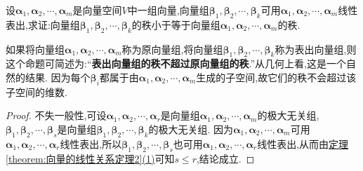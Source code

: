 \documentclass[../../main.tex]{subfiles}
\begin{document}
\begin{proposition}\label{proposition:表出向量组的秩不超过原向量组的秩}
设\(\boldsymbol{\alpha}_1,\boldsymbol{\alpha}_2,\cdots,\boldsymbol{\alpha}_m\)是向量空间\(V\)中一组向量,向量组\(\boldsymbol{\beta}_1,\boldsymbol{\beta}_2,\cdots,\boldsymbol{\beta}_k\)可用\(\boldsymbol{\alpha}_1,\boldsymbol{\alpha}_2,\cdots,\boldsymbol{\alpha}_m\)线性表出,求证:向量组\(\boldsymbol{\beta}_1,\boldsymbol{\beta}_2,\cdots,\boldsymbol{\beta}_k\)的秩小于等于向量组\(\boldsymbol{\alpha}_1,\boldsymbol{\alpha}_2,\cdots,\boldsymbol{\alpha}_m\)的秩.
\end{proposition}
\begin{remark}
如果将向量组\(\boldsymbol{\alpha}_1,\boldsymbol{\alpha}_2,\cdots,\boldsymbol{\alpha}_m\)称为原向量组,将向量组\(\boldsymbol{\beta}_1,\boldsymbol{\beta}_2,\cdots,\boldsymbol{\beta}_k\)称为表出向量组,则这个命题可简述为:“\textbf{表出向量组的秩不超过原向量组的秩}.”从几何上看,这是一个自然的结果. 因为每个\(\boldsymbol{\beta}_i\)都属于由\(\boldsymbol{\alpha}_1,\boldsymbol{\alpha}_2,\cdots,\boldsymbol{\alpha}_m\)生成的子空间,故它们的秩不会超过该子空间的维数.
\end{remark}
\begin{proof}
不失一般性,可设\(\boldsymbol{\alpha}_1,\boldsymbol{\alpha}_2,\cdots,\boldsymbol{\alpha}_r\)是向量组\(\boldsymbol{\alpha}_1,\boldsymbol{\alpha}_2,\cdots,\boldsymbol{\alpha}_m\)的极大无关组,\(\boldsymbol{\beta}_1,\boldsymbol{\beta}_2,\cdots,\boldsymbol{\beta}_s\)是向量组\(\boldsymbol{\beta}_1,\boldsymbol{\beta}_2,\cdots,\boldsymbol{\beta}_k\)的极大无关组. 因为\(\boldsymbol{\alpha}_1,\boldsymbol{\alpha}_2,\cdots,\boldsymbol{\alpha}_m\)可用\(\boldsymbol{\alpha}_1,\boldsymbol{\alpha}_2,\cdots,\boldsymbol{\alpha}_r\)线性表出,所以\(\boldsymbol{\beta}_1,\boldsymbol{\beta}_2,\cdots,\boldsymbol{\beta}_s\)也可用\(\boldsymbol{\alpha}_1,\boldsymbol{\alpha}_2,\cdots,\boldsymbol{\alpha}_r\)线性表出,从而由\hyperref[theorem:向量的线性关系定理2]{定理\ref{theorem:向量的线性关系定理2}(1)}可知\(s\leq r\),结论成立.
\end{proof}
\end{document}
